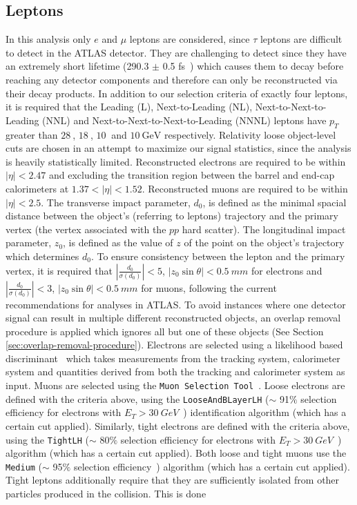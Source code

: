 \subsection{Leptons}
\label{sec:lepton-object}
In this analysis only $e$ and $\mu$ leptons are considered, since $\tau$ leptons are difficult to detect in the ATLAS detector. They are challenging to detect since they have an extremely short lifetime (290.3 $\pm$ 0.5 fs~\cite{pdg}) which causes them to decay before reaching any detector components and therefore can only be reconstructed via their decay products. In addition to our selection criteria of exactly four leptons, it is required that the Leading (L), Next-to-Leading (NL), Next-to-Next-to-Leading (NNL) and Next-to-Next-to-Next-to-Leading (NNNL) leptons have $p_{T}$ greater than $\SI{28}{}$, $\SI{18}{}$, $\SI{10}{}$ and $\SI{10}{\GeV}$ respectively. Relativity loose object-level cuts are chosen in an attempt to maximize our signal statistics, since the analysis is heavily statistically limited. Reconstructed electrons are required to be within $|\eta| < 2.47$ and excluding the transition region between the barrel and end-cap calorimeters at $1.37 < |\eta| < 1.52$. Reconstructed muons are required to be within $|\eta| < 2.5$. The transverse impact parameter, $d_{0}$, is defined as the minimal spacial distance between the object's (referring to leptons) trajectory and the primary vertex (the vertex associated with the $pp$ hard scatter). The longitudinal impact parameter, $z_{0}$, is defined as the value of $z$ of the point on the object's trajectory which determines $d_{0}$. To ensure consistency between the lepton and the primary vertex, it is required that $|\frac{d_{0}}{\sigma(d_{0})}| < 5$, $|z_{0}\sin{\theta}| < \SI{0.5}{mm}$ for electrons and $|\frac{d_{0}}{\sigma(d_{0})}| < 3$, $|z_{0}\sin{\theta}| < \SI{0.5}{mm}$ for muons, following the current recommendations for analyses in ATLAS. To avoid instances where one detector signal can result in multiple different reconstructed objects, an overlap removal procedure is applied which ignores all but one of these objects (See Section \ref{sec:overlap-removal-procedure}). Electrons are selected using a likelihood based discriminant~\cite{electronRecoAndID:paper} which takes measurements from the tracking system, calorimeter system and quantities derived from both the tracking and calorimeter system as input. Muons are selected using the \texttt{Muon Selection Tool}~\cite{muon-selection-tool}. Loose electrons are defined with the criteria above, using the \texttt{LooseAndBLayerLH} ($\sim$ 91$\%$ selection efficiency for electrons with $E_{T} > \SI{30}{GeV}$~\cite{electronIDefficiency}) identification algorithm (which has a certain cut applied). Similarly, tight electrons are defined with the criteria above, using the \texttt{TightLH} ($\sim$ 80$\%$ selection efficiency for electrons with $E_{T} > \SI{30}{GeV}$~\cite{electronIDefficiency}) algorithm (which has a certain cut applied). Both loose and tight muons use the \texttt{Medium} ($\sim$ 95$\%$ selection efficiency~\cite{muonIDEfficiency}) algorithm (which has a certain cut applied). Tight leptons additionally require that they are sufficiently isolated from other particles produced in the collision. This is done 